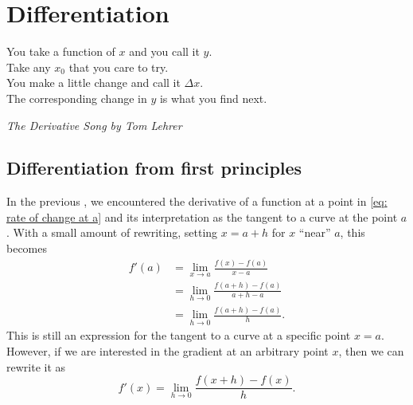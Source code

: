 
\chapter{Differentiation}
\label{sec:differentiation}
\epigraph{You take a function of $x$ and you call it $y$.\\ Take any $x_{0}$ that you care to try.\\ You make a little change and call it $\Delta x$.\\ The corresponding change in $y$ is what you find next. }{\textit{The Derivative Song by Tom Lehrer}}

\section{Differentiation from first principles}
In the previous , we encountered the derivative of a function at a point in \cref{eq: rate of change at a} and its interpretation as the tangent to a curve at the point $a$. With a small amount of rewriting, setting $x=a+h$ for $x$ ``near'' $a$, this becomes
\begin{align*}
f'(a)&=\lim_{x\to a}\frac{f(x)-f(a)}{x-a}\\
&=\lim_{h\to 0}\frac{f(a+h)-f(a)}{a+h-a}\\
&=\lim_{h\to 0}\frac{f(a+h)-f(a)}{h}.
\end{align*} 
This is still an expression for the tangent to a curve at a specific point $x=a$. However, if we are interested in the gradient at an arbitrary point $x$, then we can rewrite it as
\begin{equation}
f'(x)=\lim_{h\to 0}\frac{f(x+h)-f(x)}{h}.
\label{eq: derivative definition}
\end{equation}

